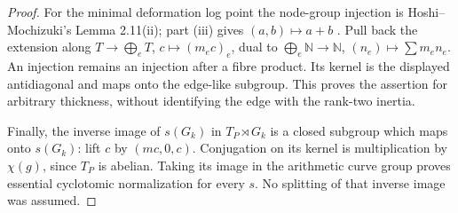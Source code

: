 \begin{proof}
For the minimal deformation log point the node-group injection is
Hoshi--Mochizuki's Lemma 2.11(ii); part (iii) gives $(a,b)\mapsto a+b$
\citep[Lemma 2.11]{BC_HMNodes}. Pull back the extension along
$T\to\bigoplus_eT$, $c\mapsto(m_ec)_e$, dual to
$\bigoplus_e\mathbb N\to\mathbb N$, $(n_e)\mapsto\sum m_en_e$. An injection remains an
injection after a fibre product. Its kernel is the displayed antidiagonal
and maps onto the edge-like subgroup. This proves the assertion for arbitrary
thickness, without identifying the edge with the rank-two inertia.

Finally, the inverse image of $s(G_k)$ in $T_P\rtimes G_k$ is a closed
subgroup which maps onto $s(G_k)$: lift $c$ by $(mc,0,c)$. Conjugation on
its kernel is multiplication by $\chi(g)$, since $T_P$ is abelian. Taking
its image in the arithmetic curve group proves essential cyclotomic
normalization for every $s$. No splitting of that inverse image was assumed.
\end{proof}

